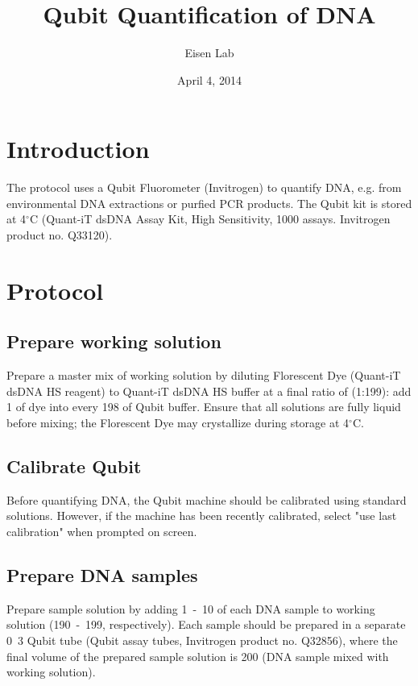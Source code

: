 \documentclass[letterpaper]{article}
\title{Qubit Quantification of DNA}
\author{Eisen Lab}
\date{April 4, 2014}
\begin{document}
\maketitle


\section{Introduction}

The protocol uses a Qubit Fluorometer (Invitrogen) to quantify DNA, e.g. from environmental DNA extractions or purfied PCR products. The Qubit kit is stored at 4$^{\circ}$C (Quant-iT dsDNA Assay Kit, High Sensitivity, 1000 assays. Invitrogen product no. Q33120).

\section{Protocol}

\subsection{Prepare working solution}

Prepare a master mix of working solution by diluting Florescent Dye (Quant-iT dsDNA HS reagent) to Quant-iT dsDNA HS buffer at a final ratio of (1:199): add \unit{1}{\micro\litre} of dye into every \unit{198}{\micro\litre} of Qubit buffer. Ensure that all solutions are fully liquid before mixing; the Florescent Dye may crystallize during storage at 4$^{\circ}$C.


\subsection{Calibrate Qubit}

Before quantifying DNA, the Qubit machine should be calibrated using standard solutions. However, if the machine has been recently calibrated, select "use last calibration" when prompted on screen.

\subsection{Prepare DNA samples}

Prepare sample solution by adding \unit{1-10}{\micro\litre} of each DNA sample to working solution (\unit{190-199}{\micro\litre}, respectively). Each sample should be prepared in a separate \unit{0.3}{\milli\litre} Qubit tube (Qubit assay tubes, Invitrogen product no. Q32856), where the final volume of the prepared sample solution is \unit{200}{\micro\litre} (DNA sample mixed with working solution).
\end{document}
